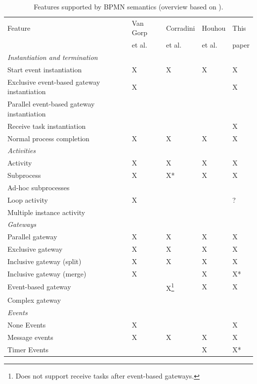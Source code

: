 \documentclass[adraft, copyright, creativecommons]{eptcs} %
\begin{document}
\begin{table}[htbp]
    \caption{Features supported by BPMN semantics (overview based on \cite{vangorpVisualTokenbasedFormalization2013}).}
    \label{tab:supportedFeatures}
    \begin{tabular}{l l l l l}
    \hline
      Feature & Van Gorp &  Corradini & Houhou & This\\
      & et al. \cite{vangorpVisualTokenbasedFormalization2013} & et al. \cite{corradiniFormalApproachAnalysis2021}& et al. \cite{houhouFirstOrderLogicVerification2022} & paper\\
      \hline
      \textit{Instantiation and termination} & &\\
      Start event instantiation & X & X & X & X\\
      Exclusive event-based gateway instantiation & X & & & X\\
      Parallel event-based gateway instantiation &  & & & \\
      Receive task instantiation & & & & X\\
      Normal process completion & X & X & X & X\\
      \textit{Activities} & & & &\\
      Activity & X & X & X & X\\
      Subprocess & X & X* & X & X\\
      Ad-hoc subprocesses & & & &\\
      Loop activity & X & & & ?\\
      Multiple instance activity & & & & \\
      \textit{Gateways} & & & &\\
      Parallel gateway & X & X & X & X\\
      Exclusive gateway & X & X & X & X\\
      Inclusive gateway (split) & X & X & X & X\\
      Inclusive gateway (merge) & X & & X & X*\\
      Event-based gateway &  & X\footnote{Does not support receive tasks after event-based gateways.} & X & X\\ %
      Complex gateway & & & &\\
      \textit{Events} & & & & \\
      None Events & X & & & X\\
      Message events & X & X & X & X\\
      Timer Events & & & X & X*\\

\end{tabular}
\end{table}
\end{document}
